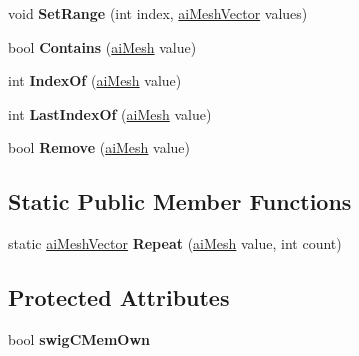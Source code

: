 \begin{DoxyCompactItemize}
\item 
\hypertarget{classai_mesh_vector_a50cc28f92b9d1436508eecaf9138a69d}{void {\bfseries Set\+Range} (int index, \hyperlink{classai_mesh_vector}{ai\+Mesh\+Vector} values)}\label{classai_mesh_vector_a50cc28f92b9d1436508eecaf9138a69d}

\item 
\hypertarget{classai_mesh_vector_a04eafdfc1c2f593dfaac40e864363894}{bool {\bfseries Contains} (\hyperlink{structai_mesh}{ai\+Mesh} value)}\label{classai_mesh_vector_a04eafdfc1c2f593dfaac40e864363894}

\item 
\hypertarget{classai_mesh_vector_a70a902747db5ab781365285cc7efdbad}{int {\bfseries Index\+Of} (\hyperlink{structai_mesh}{ai\+Mesh} value)}\label{classai_mesh_vector_a70a902747db5ab781365285cc7efdbad}

\item 
\hypertarget{classai_mesh_vector_a48bfd1753284ce0fc6c9ade7c79ac960}{int {\bfseries Last\+Index\+Of} (\hyperlink{structai_mesh}{ai\+Mesh} value)}\label{classai_mesh_vector_a48bfd1753284ce0fc6c9ade7c79ac960}

\item 
\hypertarget{classai_mesh_vector_a58bf07c55aafef9594f3189f099d2723}{bool {\bfseries Remove} (\hyperlink{structai_mesh}{ai\+Mesh} value)}\label{classai_mesh_vector_a58bf07c55aafef9594f3189f099d2723}

\end{DoxyCompactItemize}
\subsection*{Static Public Member Functions}
\begin{DoxyCompactItemize}
\item 
\hypertarget{classai_mesh_vector_a01f6315757d9f04c9c3b37f694884b2e}{static \hyperlink{classai_mesh_vector}{ai\+Mesh\+Vector} {\bfseries Repeat} (\hyperlink{structai_mesh}{ai\+Mesh} value, int count)}\label{classai_mesh_vector_a01f6315757d9f04c9c3b37f694884b2e}

\end{DoxyCompactItemize}
\subsection*{Protected Attributes}
\begin{DoxyCompactItemize}
\item 
\hypertarget{classai_mesh_vector_a1559d22aeabf4a4927585c59e498111b}{bool {\bfseries swig\+C\+Mem\+Own}}\label{classai_mesh_vector_a1559d22aeabf4a4927585c59e498111b}

\end{DoxyCompactItemize}

